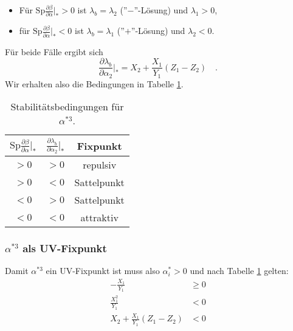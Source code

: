 \documentclass{article}
\newcommand{\Sp}{ \text{Sp} \frac{\partial \beta}{\partial \alpha}}
\begin{document}
 		\begin{itemize}
 		\item Für $\Sp|_*>0$ ist $\lambda_b=\lambda_2$ (''$-$''-Lösung) und 	
 		$\lambda_1>0$,
 		\item für $\Sp|_*<0$ ist $\lambda_b=\lambda_1$ (''$+$''-Lösung) und 
 		$\lambda_2<0$.
 		\end{itemize}
 		Für beide Fälle ergibt sich
 		\begin{equation}
 		\frac{\partial \lambda_b}{\partial \alpha_2}|_*=X_2+\frac{X_1}{Y_1}
 		(Z_1-Z_2) \quad .
 		\end{equation}
 		Wir erhalten also die Bedingungen in Tabelle \ref{stab3}.
 		
 		\begin{table}
 		\begin{tabular}{ccc}
 		\toprule
 		$\Sp|_*$ & $\frac{\partial \lambda_b}{\partial \alpha_2}|_*$ & Fixpunkt\\
 		\midrule
 		$>0$ & $>0$ & repulsiv \\
 		$>0$ & $<0$ & Sattelpunkt\\
 		$<0$ & $>0$ & Sattelpunkt\\
 		$<0$ & $<0$ & attraktiv\\
 		\bottomrule 
 		\end{tabular}
 		\caption{Stabilitätsbedingungen für $\alpha^{*3}$.} \label{stab3}
 		\end{table}
 		
 		\subsubsection{$\alpha^{*3}$ als UV-Fixpunkt}
 		Damit $\alpha^{*3}$ ein UV-Fixpunkt ist muss also $\alpha^*_i>0$ und 
 		nach Tabelle \ref{stab3} gelten:
 		\begin{align}
 		-\frac{X_1}{Y_1}&\geq 0 \\
 		\frac{X_1^2}{Y_1} &< 0 \\
 		X_2+\frac{X_1}{Y_1}(Z_1-Z_2)&<0
 		\end{align}
 
\end{document}
